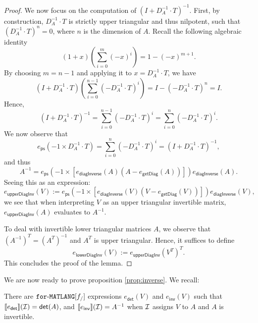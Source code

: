 \begin{proof}
We now focus on the computation of $\left( I+D_A^{-1}\cdot T\right)^{-1}$. First, by construction, $D_A^{-1}\cdot T$ is strictly upper triangular and thus nilpotent, 
such that $\left( D_A^{-1}\cdot T\right)^n=0$, where $n$ is the dimension of $A$.
Recall the following algebraic identity 
$$(1+x)\left( \sum_{i=0}^{m}(-x)^i \right)=1-(-x)^{m+1}.$$
By choosing $m=n-1$ and applying it to $x=D_A^{-1}\cdot T$, we have
$$
\left(I+D_A^{-1}\cdot T \right)\left( \sum_{i=0}^{n-1}(-D_A^{-1}\cdot T)^i \right)=I- \left( -D_A^{-1}\cdot T\right)^n =I.
$$
Hence,
$$
\left(I+D_A^{-1}\cdot T \right)^{-1}=\sum_{i=0}^{n-1}(-D_A^{-1}\cdot T)^i=\sum_{i=0}^{n}(-D_A^{-1}\cdot T)^i.
$$
We now observe that
$$
e_{\mathsf{ps}}(-1\times D_A^{-1}\cdot T)=\sum_{i=0}^{n}(-D_A^{-1}\cdot T)^i=\left(I+D_A^{-1}\cdot T \right)^{-1},
$$
and thus 
$$
A^{-1}= e_{\mathsf{ps}}\left(-1\times \left[e_{\mathsf{diagInverse}}(A)(A-e_{\mathsf{getDiag}}(A))\right] \right)e_{\mathsf{diagInverse}}(A).
$$
Seeing this as an expression:
$$
e_{\mathsf{upperDiagInv}}(V):= e_{\mathsf{ps}}\left(-1\times \left[e_{\mathsf{diagInverse}}(V)(V-e_{\mathsf{getDiag}}(V))\right] \right)e_{\mathsf{diagInverse}}(V),
$$
we see that  when interpreting $V$ as an  upper triangular invertible matrix, 
$e_{\mathsf{upperDiagInv}}(A)$ evaluates to $A^{-1}$.


To deal with invertible lower triangular matrices $A$, we observe that  $\left(A^{-1}\right)^T=\left(A^T\right)^{-1}$ and $A^T$ is upper triangular.
Hence, it suffices to define
$$
e_{\mathsf{lowerDiagInv}}(V):= e_{\mathsf{upperDiagInv}}(V^T)^T.
$$
This concludes the proof of the lemma.
\end{proof}

We are now ready to prove proposition \ref{prop:inverse}. We recall:
\begin{INVERSE}
  There are $\texttt{for}\text{-}\texttt{MATLANG}[f_/]$ expressions $e_{\mathsf{det}}(V)$ and $e_{\mathsf{inv}}(V)$ such that
  $\llbracket e_{\mathsf{det}} \rrbracket(\mathcal{I})=\mathsf{det}(A)$, and  
  $\llbracket e_{\mathsf{inv}} \rrbracket(\mathcal{I})=A^{-1}$ when $\mathcal{I}$ assigns $V$
  to $A$ and $A$ is invertible.
\end{INVERSE}

